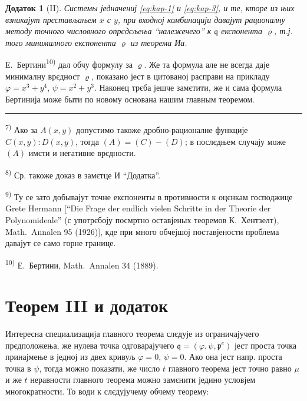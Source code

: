 \documentclass[11pt]{article}
\newcommand{\foreign}[1]{#1}
\theoremstyle{plain}
\newtheorem{zusatz}{Додаток}
\begin{document}
\begin{zusatz}[II]
Системы једначениј \eqref{eq:kap-1} и \eqref{eq:kap-3}, и те, кторе
из њих взникајут прєстављањем $x$ с $y$, при входној комбинацији
давајут рационалну методу точного числовного опрєдєљења
``належечего'' к $\mathfrak{q}$ експонента
$\varrho$, т.ј. того минималного експонента $\varrho$ из теорема Иа.
\end{zusatz}

Е.\ Бертини\textsuperscript{10)} дал обчу формулу за $\varrho$.
Же та формула але не всегда даје минималну врєдност $\varrho$,
показано јест в цитованој расправи на прикладу
$\varphi = x^{3} + y^{4}$, $\psi = x^{2} + y^{3}$. Наконец трєба
јешче замєтити, же и сама формула Бертинија може быти по новому
основана нашим главным теоремом.

\vspace{0.5em}
\noindent\rule{\textwidth}{0.4pt}
\vspace{0.3em}

{\footnotesize
\textsuperscript{7)} Ако за $A(x,y)$ допустимо такоже дробно-рационалне
функције $C(x,y):D(x,y)$, тогда $(A) = (C) - (D)$; в послєдњем
случају може $(A)$ имєти и негативне врєдности.

\textsuperscript{8)} Ср. такоже доказ в замєтце И ``Додатка''.

\textsuperscript{9)} Ту се зато добывајут точне експоненты в противности к
оцєнкам господжице Grete Hermann [``\foreign{Die Frage der endlich vielen Schritte
in der Theorie der Polynomideale}'' (с употрєбоју посмртно оставјеных
теоремов К.\ Хентзелт), \foreign{Math.\ Annalen} 95 (1926)], кде при
много обчејшој поставјености проблема давајут се само горне границе.

\textsuperscript{10)} Е.\ Бертини, \foreign{Math.\ Annalen} 34 (1889).
}

\newpage
\section*{Теорем III и додаток}

Интересна специализација главного теорема слєдује из ограничајучего
прєдположења, же нулева точка одговарајучего
$\mathfrak{q} = (\varphi, \psi, \mathfrak{p}^{e})$ јест проста
точка принајмење в једној из двех кривуљ $\varphi = 0$, $\psi = 0$.
Ако она јест напр. проста точка в $\psi$, тогда можно показати, же
число $t$ главного теорема јест точно равно $\mu$ и же $t$
неравности главного теорема можно замєнити једино условјем
многократности. То води к слєдујучему обчему теорему:
\end{document}
